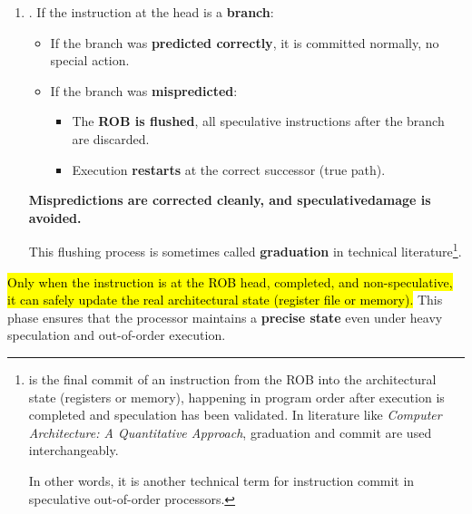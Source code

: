 \begin{enumerate}
\begin{enumerate}
        \item {}. If the instruction at the head is a \textbf{branch}:
        \begin{itemize}
            \item[\textcolor{Green3}{\faIcon{check}}] If the branch was \textbf{predicted correctly}, it is committed normally, no special action.
            \item[\textcolor{Red2}{\faIcon{times}}] If the branch was \textbf{mispredicted}:
            \begin{itemize}
                \item The \textbf{ROB is flushed}, all speculative instructions after the branch are discarded.
                \item Execution \textbf{restarts} at the correct successor (true path).
            \end{itemize}
        \end{itemize}
        \textcolor{Green3}{\faIcon{\speedIcon} \textbf{Mispredictions are corrected cleanly, and speculative\break damage is avoided.}}

        This flushing process is sometimes called \textbf{graduation} in technical literature\footnote{%
             is the final commit of an instruction from the ROB into the architectural state (registers or memory), happening in program order after execution is completed and speculation has been validated. In literature like \emph{Computer Architecture: A Quantitative Approach}\cite{hennessy2017computer}, graduation and commit are used interchangeably.

            In other words, it is another technical term for instruction commit in speculative out-of-order processors.
        }.
    \end{enumerate}
    \hl{Only when the instruction is at the ROB head, completed, and non-speculative, it can safely update the real architectural state (register file or memory).} This phase ensures that the processor maintains a \textbf{precise state} even under heavy speculation and out-of-order execution.
\end{enumerate}

\newpage


